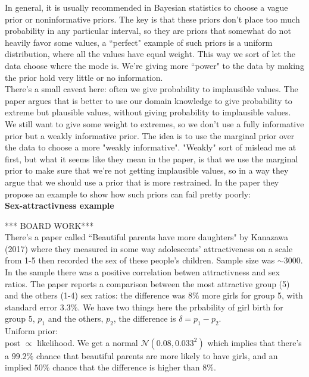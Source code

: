 \documentclass[]{article}
\begin{document}
\noindent In general, it is usually recommended in Bayesian statistics to choose a vague prior or noninformative priors. The key is that these priors don't place too much probability in any particular interval, so they are priors that somewhat do not heavily favor some values, a ``perfect" example of such priors is a uniform distribution, where all the values have equal weight. This way we sort of let the data choose where the mode is. We're giving more ``power" to the data by making the prior hold very little or no information. \\

\noindent There's a small caveat here: often we give probability to implausible values. The paper argues that is better to use our domain knowledge to give probability to extreme but plausible values, without giving probability to implausible values. We still want to give some weight to extremes, so we don't use a fully informative prior but a weakly informative prior. The idea is to use the marginal prior over the data to choose a more "weakly informative". "Weakly" sort of mislead me at first, but what it seems like they mean in the paper, is that we use the marginal prior to make sure that we're not getting implausible values, so in a way they argue that we should use a prior that is more restrained. In the paper they propose an example to show how such priors can fail pretty poorly: \\

\textbf{Sex-attractivness example}

*** BOARD WORK*** \\
There's a paper called ``Beautiful parents have more daughters" by Kanazawa (2017) where they measured in some way adolescents' attractiveness on a scale from 1-5 then recorded the sex of these people's children. Sample size was $\sim 3000$. In the sample there was a positive correlation betwen attractivness and sex ratios. The paper reports a comparison between the most attractive group (5) and the others (1-4) sex ratios: the difference was $8\%$ more girls for group 5, with standard error $3.3\%$. We have two things here the prbability of girl birth for group $5$, $p_1$ and the others, $p_2$, the difference is $\delta = p_1 - p_2$.\\

\noindent Uniform prior:\\ 
post $\propto$ likelihood. We get a normal $\mathcal{N}(0.08, 0.033^2)$ which implies that there's a $99.2\%$ chance that beautiful parents are more likely to have girls, and an implied $50\%$ chance that the difference is higher than $8\%$. 
\end{document}
